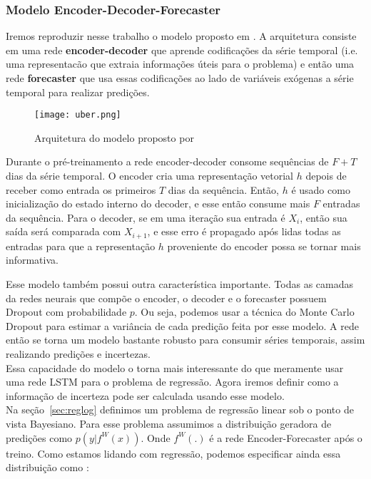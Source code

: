 \subsubsection{Modelo Encoder-Decoder-Forecaster}

Iremos reproduzir nesse trabalho o modelo proposto em \cite{ubertime}. A
arquitetura consiste em uma rede \textbf{encoder-decoder} que aprende codificações da
série temporal (i.e. uma representacão que extraia informações úteis para o
problema) e então uma rede \textbf{forecaster} que usa essas codificações ao lado de
variáveis exógenas a série temporal para realizar predições.  


\begin{figure}[H]
\centering
\texttt{[image: uber.png]}
\caption{Arquitetura do modelo proposto por \cite{ubertime}}
\end{figure}


Durante o pré-treinamento a rede encoder-decoder consome sequências de $F + T$ dias
da série temporal. O encoder cria uma representação vetorial $h$ depois de
receber como entrada os primeiros $T$ dias da sequência. Então, $h$ é usado como
inicialização do estado interno do decoder, e esse então consume mais $F$
entradas da sequência. Para o decoder, se em uma iteração sua entrada é $X_i$,
então sua saída será comparada com $X_{i+1}$, e esse erro é propagado após lidas
todas as entradas para que a representação $h$ proveniente do encoder possa se
tornar mais informativa.


Esse modelo também possui outra característica importante. Todas as camadas da
redes neurais que compõe o encoder, o decoder e o forecaster possuem
Dropout com probabilidade $p$. Ou seja, podemos usar a técnica do Monte
Carlo Dropout para estimar a variância de cada predição feita por esse modelo. A
rede então se torna um modelo bastante robusto para consumir séries temporais,
assim realizando predições e incertezas.\\


Essa capacidade do modelo o torna mais interessante do que meramente usar uma
rede LSTM para o problema de regressão. Agora iremos definir como a informação
de incerteza pode ser calculada usando esse modelo. \\

Na seção~\ref{sec:reglog} definimos um problema de regressão linear sob o ponto
de vista Bayesiano. Para esse problema assumimos a distribuição geradora de
predições como $p(y |f^W(x))$. Onde $f^W(.)$ é a rede Encoder-Forecaster após o treino.
Como estamos lidando com regressão, podemos especificar ainda essa distribuição
como \citep{ubertime}:  

